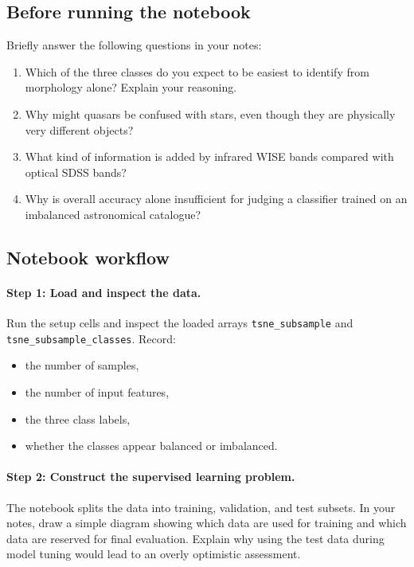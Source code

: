 \subsection*{Before running the notebook}
Briefly answer the following questions in your notes:
\begin{enumerate}
    \item Which of the three classes do you expect to be easiest to identify from morphology alone? Explain your reasoning.
    \item Why might quasars be confused with stars, even though they are physically very different objects?
    \item What kind of information is added by infrared WISE bands compared with optical SDSS bands?
    \item Why is overall accuracy alone insufficient for judging a classifier trained on an imbalanced astronomical catalogue?
\end{enumerate}

\subsection*{Notebook workflow}

\paragraph{Step 1: Load and inspect the data.}
Run the setup cells and inspect the loaded arrays \texttt{tsne\_subsample} and \texttt{tsne\_subsample\_classes}. Record:
\begin{itemize}
    \item the number of samples,
    \item the number of input features,
    \item the three class labels,
    \item whether the classes appear balanced or imbalanced.
\end{itemize}

\paragraph{Step 2: Construct the supervised learning problem.}
The notebook splits the data into training, validation, and test subsets. In your notes, draw a simple diagram showing which data are used for training and which data are reserved for final evaluation. Explain why using the test data during model tuning would lead to an overly optimistic assessment.

